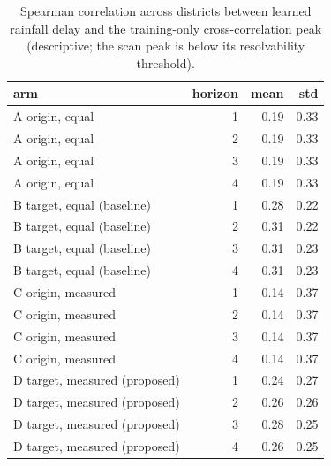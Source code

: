 \begin{table}[t]
\centering
\small
\caption{Spearman correlation across districts between learned rainfall delay and the training-only cross-correlation peak (descriptive; the scan peak is below its resolvability threshold).}
\label{tab:kernel-vs-scan-spearman}
\begin{tabular}{lrrr}
\toprule
arm & horizon & mean & std \\
\midrule
A origin, equal & 1 & 0.19 & 0.33 \\
A origin, equal & 2 & 0.19 & 0.33 \\
A origin, equal & 3 & 0.19 & 0.33 \\
A origin, equal & 4 & 0.19 & 0.33 \\
B target, equal (baseline) & 1 & 0.28 & 0.22 \\
B target, equal (baseline) & 2 & 0.31 & 0.22 \\
B target, equal (baseline) & 3 & 0.31 & 0.23 \\
B target, equal (baseline) & 4 & 0.31 & 0.23 \\
C origin, measured & 1 & 0.14 & 0.37 \\
C origin, measured & 2 & 0.14 & 0.37 \\
C origin, measured & 3 & 0.14 & 0.37 \\
C origin, measured & 4 & 0.14 & 0.37 \\
D target, measured (proposed) & 1 & 0.24 & 0.27 \\
D target, measured (proposed) & 2 & 0.26 & 0.26 \\
D target, measured (proposed) & 3 & 0.28 & 0.25 \\
D target, measured (proposed) & 4 & 0.26 & 0.25 \\
\bottomrule
\end{tabular}
\end{table}
